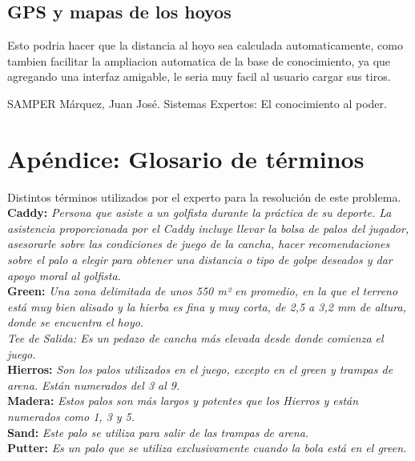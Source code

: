 \documentclass[runningheads,a4paper]{llncs}
\begin{document}
\subsection{GPS y mapas de los hoyos}
Esto podria hacer que la distancia al hoyo sea calculada automaticamente, como tambien facilitar la ampliacion automatica de la base de conocimiento, ya que agregando una interfaz amigable, le seria muy facil al usuario cargar sus tiros.


\begin{thebibliography}{7}

 SAMPER Márquez, Juan José. Sistemas Expertos: El conocimiento al poder.

\end{thebibliography}


\section*{Apéndice: Glosario de términos}
Distintos términos utilizados por el experto para la resolución de este problema.\\
\textbf{Caddy:} \textit{Persona que asiste a un golfista durante la práctica de su deporte. La asistencia proporcionada por el Caddy incluye llevar la bolsa de palos del jugador, asesorarle sobre las condiciones de juego de la cancha, hacer recomendaciones sobre el palo a elegir para obtener una distancia o tipo de golpe deseados y dar apoyo moral al golfista.}\\
\textbf{Green:}  \textit{Una zona delimitada de unos 550 m² en promedio, en la que el terreno está muy bien alisado y la hierba es fina y muy corta, de 2,5 a 3,2 mm de altura, donde se encuentra el hoyo.\\
Tee de Salida: Es un pedazo de cancha más elevada desde donde comienza el juego.}\\
\textbf{Hierros:} \textit{Son los palos utilizados en el juego, excepto en el green y trampas de arena. Están numerados del 3 al 9.}\\
\textbf{Madera:} \textit{Estos palos son más largos y potentes que los Hierros y están numerados como 1, 3 y 5.}\\
\textbf{Sand:} \textit{Este palo se utiliza para salir de las trampas de arena.}\\
\textbf{Putter:} \textit{Es un palo que se utiliza exclusivamente cuando la bola está en el green.}
\end{document}

